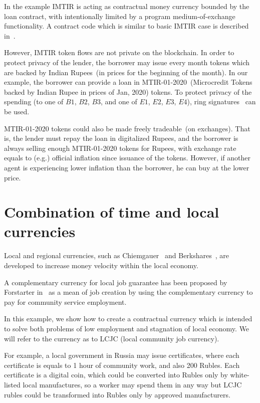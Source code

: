 \documentclass[]{llncs}   %
\begin{document}
 
 In the example IMTIR is acting as contractual money currency bounded by the loan contract, with intentionally limited by a
 program medium-of-exchange functionality. A contract code which is similar to basic IMTIR case is described in~\cite{scpeople}.

 However, IMTIR token flows are not private on the blockchain. In order to protect privacy of the lender, the borrower
 may issue every month tokens which are backed by Indian Rupees~(in prices for the beginning of the month). In our example, the
 borrower can provide a loan in MTIR-01-2020~(Microcredit Tokens backed by Indian Rupee in prices of
 Jan, 2020) tokens. To protect privacy of the spending (to one of $B1$, $B2$, $B3$, and one of $E1$, $E2$, $E3$, $E4$), ring
 signatures~\cite{rivest2001leak} can be used.

 MTIR-01-2020 tokens could also be made freely tradeable~(on exchanges). That is, the lender must repay the loan in
 digitalized Rupees, and the borrower is always selling enough MTIR-01-2020 tokens for Rupees, with exchange rate equals
 to (e.g.) official inflation since issuance of the tokens. However, if another agent is experiencing lower inflation
 than the borrower, he can buy at the lower price.

\section{Combination of time and local currencies}
\label{sec-combination}

Local and regional currencies, such as Chiemgauer~\cite{thiel2011complementary} and Berkshares~\cite{swann1995local}, are developed to increase money velocity within the local economy.

A complementary currency for local job guarantee has been proposed by Forstarter in~\cite{forstater2018complementary} as a mean
of job creation by using the complementary currency to pay for community service employment.

In this example, we show how to create a contractual currency which is intended to solve both problems of low
employment and stagnation of local economy. We will refer to the currency as to LCJC (local community job currency).

For example, a local government in Russia may issue certificates, where each certificate is equals to 1 hour of community work, and also 200 Rubles. Each certificate is a digital coin, which could be converted into Rubles only by white-listed local manufactures, so a worker may spend them in any way but LCJC rubles could be transformed into Rubles only by approved manufacturers.
\end{document}
